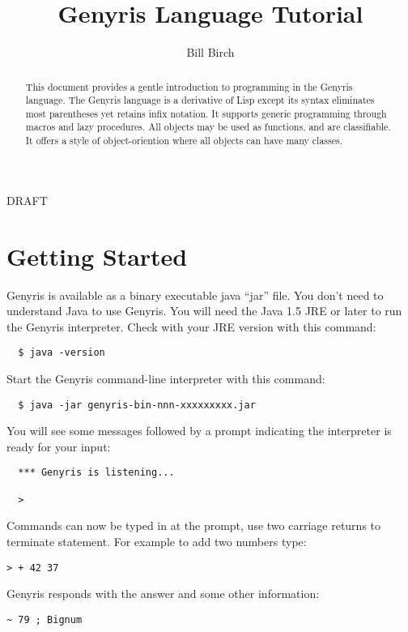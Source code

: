 \documentclass[a4paper,12pt,dvips]{article}
\begin{document}
\author{Bill Birch}
\title{Genyris Language Tutorial}
\maketitle
\begin{center}
\Huge DRAFT
\end{center}
\begin{abstract}
This document provides a gentle introduction to programming in the Genyris language. The Genyris language is a derivative of Lisp except its syntax eliminates most parentheses yet retains infix notation. It supports generic programming through macros and lazy procedures. All objects may be used as functions, and are classifiable. It offers a style of object-oriention where all objects can have many classes. 

\end{abstract}
\tableofcontents
\pagebreak
\section{Getting Started}
Genyris is available as a binary executable java ``jar'' file. You don't need to understand Java to use Genyris. You will need the Java 1.5 JRE or later to run the Genyris interpreter. Check with your JRE
version with this command:

\begin{verbatim}
  $ java -version
\end{verbatim}
Start the Genyris command-line interpreter with this command:

\begin{verbatim}
  $ java -jar genyris-bin-nnn-xxxxxxxxx.jar
\end{verbatim}

You will see some messages followed by a prompt indicating the interpreter is ready for your input:

\begin{verbatim}
  *** Genyris is listening...

  >
\end{verbatim}

Commands can now be typed in at the prompt, use two carriage returns to terminate statement. For example to add two numbers type:
\begin{verbatim}
> + 42 37
\end{verbatim}
\hookleftarrow
\hookleftarrow
Genyris responds with the answer and some other information:
\begin{verbatim}
~ 79 ; Bignum
\end{verbatim}
\end{document}
